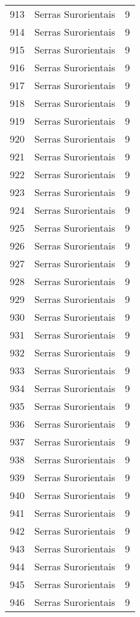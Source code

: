 \begin{table}[p]
\begin{tabular}{rlr}
  913 & Serras Surorientais &   9 \\ 
  914 & Serras Surorientais &   9 \\ 
  915 & Serras Surorientais &   9 \\ 
  916 & Serras Surorientais &   9 \\ 
  917 & Serras Surorientais &   9 \\ 
  918 & Serras Surorientais &   9 \\ 
  919 & Serras Surorientais &   9 \\ 
  920 & Serras Surorientais &   9 \\ 
  921 & Serras Surorientais &   9 \\ 
  922 & Serras Surorientais &   9 \\ 
  923 & Serras Surorientais &   9 \\ 
  924 & Serras Surorientais &   9 \\ 
  925 & Serras Surorientais &   9 \\ 
  926 & Serras Surorientais &   9 \\ 
  927 & Serras Surorientais &   9 \\ 
  928 & Serras Surorientais &   9 \\ 
  929 & Serras Surorientais &   9 \\ 
  930 & Serras Surorientais &   9 \\ 
  931 & Serras Surorientais &   9 \\ 
  932 & Serras Surorientais &   9 \\ 
  933 & Serras Surorientais &   9 \\ 
  934 & Serras Surorientais &   9 \\ 
  935 & Serras Surorientais &   9 \\ 
  936 & Serras Surorientais &   9 \\ 
  937 & Serras Surorientais &   9 \\ 
  938 & Serras Surorientais &   9 \\ 
  939 & Serras Surorientais &   9 \\ 
  940 & Serras Surorientais &   9 \\ 
  941 & Serras Surorientais &   9 \\ 
  942 & Serras Surorientais &   9 \\ 
  943 & Serras Surorientais &   9 \\ 
  944 & Serras Surorientais &   9 \\ 
  945 & Serras Surorientais &   9 \\ 
  946 & Serras Surorientais &   9 \\ 

\end{tabular}
\end{table}
